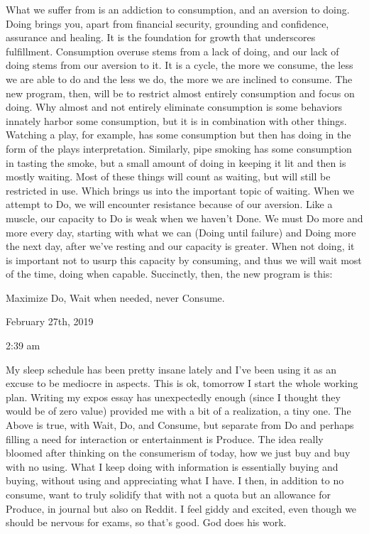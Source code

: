 What we suffer from is an addiction to consumption, and an aversion to
doing. Doing brings you, apart from financial security, grounding and
confidence, assurance and healing. It is the foundation for growth that
underscores fulfillment. Consumption overuse stems from a lack of doing,
and our lack of doing stems from our aversion to it. It is a cycle, the
more we consume, the less we are able to do and the less we do, the more
we are inclined to consume. The new program, then, will be to restrict
almost entirely consumption and focus on doing. Why almost and not
entirely eliminate consumption is some behaviors innately harbor some
consumption, but it is in combination with other things. Watching a
play, for example, has some consumption but then has doing in the form
of the plays interpretation. Similarly, pipe smoking has some
consumption in tasting the smoke, but a small amount of doing in keeping
it lit and then is mostly waiting. Most of these things will count as
waiting, but will still be restricted in use. Which brings us into the
important topic of waiting. When we attempt to Do, we will encounter
resistance because of our aversion. Like a muscle, our capacity to Do is
weak when we haven't Done. We must Do more and more every day, starting
with what we can (Doing until failure) and Doing more the next day,
after we've resting and our capacity is greater. When not doing, it is
important not to usurp this capacity by consuming, and thus we will wait
most of the time, doing when capable. Succinctly, then, the new program
is this:

Maximize Do, Wait when needed, never Consume.

\bigskip
\bigskip
February 27th, 2019

2:39 am

My sleep schedule has been pretty insane lately and I've been using it
as an excuse to be mediocre in aspects. This is ok, tomorrow I start the
whole working plan. Writing my expos essay has unexpectedly enough
(since I thought they would be of zero value) provided me with a bit of
a realization, a tiny one. The Above is true, with Wait, Do, and
Consume, but separate from Do and perhaps filling a need for interaction
or entertainment is Produce. The idea really bloomed after thinking on
the consumerism of today, how we just buy and buy with no using. What I
keep doing with information is essentially buying and buying, without
using and appreciating what I have. I then, in addition to no consume,
want to truly solidify that with not a quota but an allowance for
Produce, in journal but also on Reddit. I feel giddy and excited, even
though we should be nervous for exams, so that's good. God does his
work.

